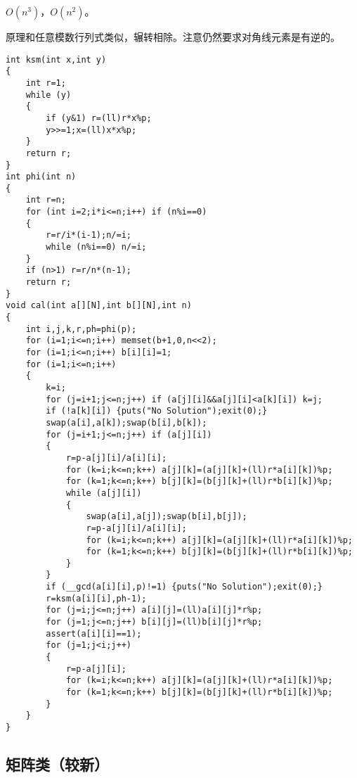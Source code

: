 \documentclass[12pt]{ctexart}
\begin{document}
$O(n^3)$，$O(n^2)$。

原理和任意模数行列式类似，辗转相除。注意仍然要求对角线元素是有逆的。

\begin{lstlisting}
int ksm(int x,int y)
{
	int r=1;
	while (y)
	{
		if (y&1) r=(ll)r*x%p;
		y>>=1;x=(ll)x*x%p;
	}
	return r;
}
int phi(int n)
{
	int r=n;
	for (int i=2;i*i<=n;i++) if (n%i==0)
	{
		r=r/i*(i-1);n/=i;
		while (n%i==0) n/=i;
	}
	if (n>1) r=r/n*(n-1);
	return r;
}
void cal(int a[][N],int b[][N],int n)
{
	int i,j,k,r,ph=phi(p);
	for (i=1;i<=n;i++) memset(b+1,0,n<<2);
	for (i=1;i<=n;i++) b[i][i]=1;
	for (i=1;i<=n;i++)
	{
		k=i;
		for (j=i+1;j<=n;j++) if (a[j][i]&&a[j][i]<a[k][i]) k=j;
		if (!a[k][i]) {puts("No Solution");exit(0);}
		swap(a[i],a[k]);swap(b[i],b[k]);
		for (j=i+1;j<=n;j++) if (a[j][i])
		{
			r=p-a[j][i]/a[i][i];
			for (k=i;k<=n;k++) a[j][k]=(a[j][k]+(ll)r*a[i][k])%p;
			for (k=1;k<=n;k++) b[j][k]=(b[j][k]+(ll)r*b[i][k])%p;
			while (a[j][i])
			{
				swap(a[i],a[j]);swap(b[i],b[j]);
				r=p-a[j][i]/a[i][i];
				for (k=i;k<=n;k++) a[j][k]=(a[j][k]+(ll)r*a[i][k])%p;
				for (k=1;k<=n;k++) b[j][k]=(b[j][k]+(ll)r*b[i][k])%p;
			}
		}
		if (__gcd(a[i][i],p)!=1) {puts("No Solution");exit(0);}
		r=ksm(a[i][i],ph-1);
		for (j=i;j<=n;j++) a[i][j]=(ll)a[i][j]*r%p;
		for (j=1;j<=n;j++) b[i][j]=(ll)b[i][j]*r%p;
		assert(a[i][i]==1);
		for (j=1;j<i;j++)
		{
			r=p-a[j][i];
			for (k=i;k<=n;k++) a[j][k]=(a[j][k]+(ll)r*a[i][k])%p;
			for (k=1;k<=n;k++) b[j][k]=(b[j][k]+(ll)r*b[i][k])%p;
		}
	}
}
\end{lstlisting}

\subsection{矩阵类（较新）}
\end{document}
